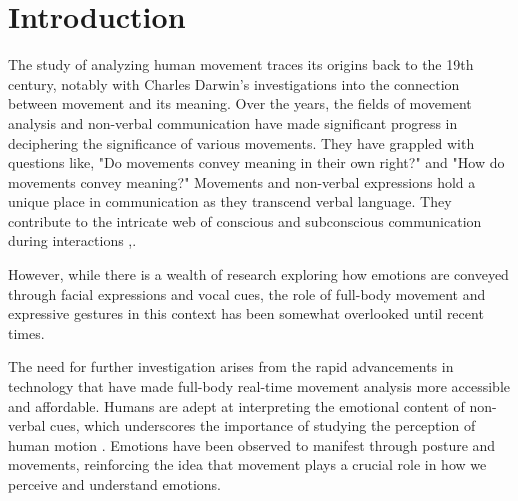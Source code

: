 \section{Introduction}
The study of analyzing human movement traces its origins back to the 19th century, notably with Charles Darwin's investigations into the connection between movement and its meaning. 
Over the years, the fields of movement analysis and non-verbal communication have made significant progress in deciphering the significance of various movements. 
They have grappled with questions like, "Do movements convey meaning in their own right?" and "How do movements convey meaning?"
Movements and non-verbal expressions hold a unique place in communication as they transcend verbal language. 
They contribute to the intricate web of conscious and subconscious communication during interactions \cite{Daly:1988},\cite{laffaye:2013}. 

However, while there is a wealth of research exploring how emotions are conveyed through facial expressions and vocal cues, the role of full-body movement and expressive gestures in this context has been somewhat overlooked until recent times.

The need for further investigation arises from the rapid advancements in technology that have made full-body real-time movement analysis more accessible and affordable. 
Humans are adept at interpreting the emotional content of non-verbal cues, which underscores the importance of studying the perception of human motion \cite{samadani:2011}. 
Emotions have been observed to manifest through posture and movements, reinforcing the idea that movement plays a crucial role in how we perceive and understand emotions.

